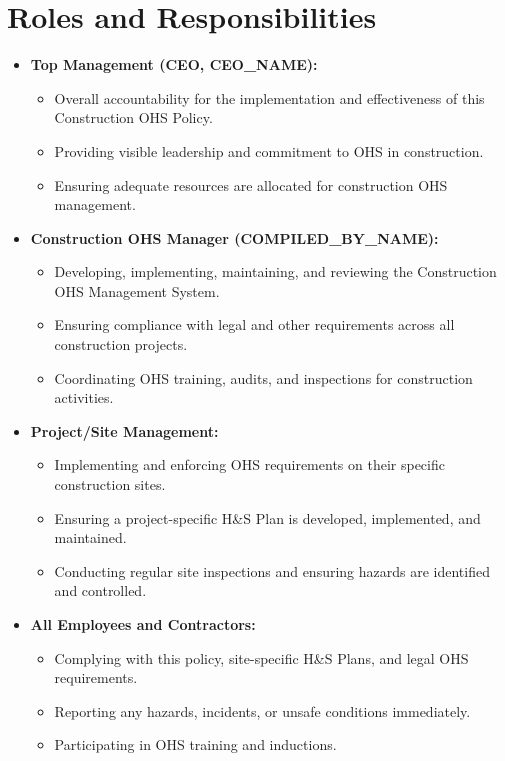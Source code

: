 \documentclass[11pt]{article}
\newcommand{\compilerName}{{{COMPILED_BY_NAME}}}
\begin{document}
\section{Roles and Responsibilities}
\begin{itemize}
    \item \textbf{Top Management (CEO, {{CEO_NAME}}):}
    \begin{itemize}
        \item Overall accountability for the implementation and effectiveness of this Construction OHS Policy.
        \item Providing visible leadership and commitment to OHS in construction.
        \item Ensuring adequate resources are allocated for construction OHS management.
    \end{itemize}
    \item \textbf{Construction OHS Manager (\compilerName):}
    \begin{itemize}
        \item Developing, implementing, maintaining, and reviewing the Construction OHS Management System.
        \item Ensuring compliance with legal and other requirements across all construction projects.
        \item Coordinating OHS training, audits, and inspections for construction activities.
    \end{itemize}
    \item \textbf{Project/Site Management:}
    \begin{itemize}
        \item Implementing and enforcing OHS requirements on their specific construction sites.
        \item Ensuring a project-specific H\&S Plan is developed, implemented, and maintained.
        \item Conducting regular site inspections and ensuring hazards are identified and controlled.
    \end{itemize}
    \item \textbf{All Employees and Contractors:}
    \begin{itemize}
        \item Complying with this policy, site-specific H\&S Plans, and legal OHS requirements.
        \item Reporting any hazards, incidents, or unsafe conditions immediately.
        \item Participating in OHS training and inductions.
    \end{itemize}
\end{itemize}
\end{document}
